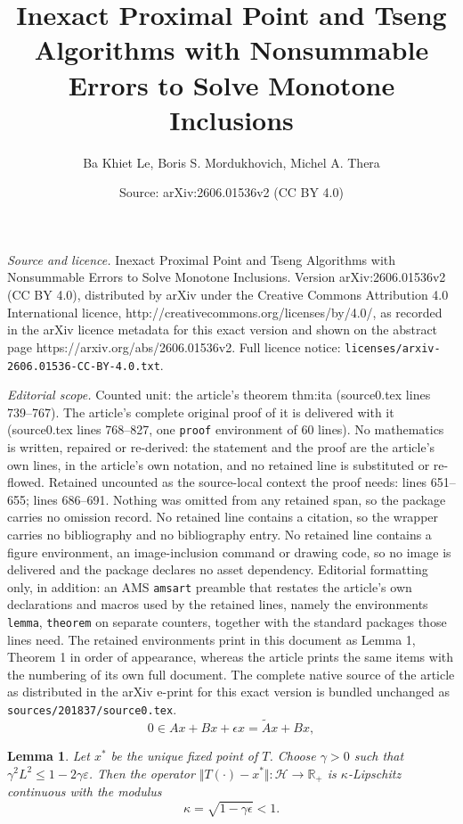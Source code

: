 \documentclass[10pt,a4paper]{amsart}
\title{Inexact Proximal Point and Tseng Algorithms with Nonsummable Errors to Solve Monotone Inclusions}
\author{Ba Khiet Le, Boris S. Mordukhovich, Michel A. Thera}
\date{Source: arXiv:2606.01536v2 (CC BY 4.0)}
\newtheorem{lemma}{Lemma}
\newcommand{\R}{{\mathbb R}}
\begin{document}
\maketitle

\noindent\emph{Source and licence.} Inexact Proximal Point and Tseng Algorithms with Nonsummable Errors to Solve Monotone Inclusions. Version arXiv:2606.01536v2 (CC BY 4.0), distributed by arXiv under the Creative Commons Attribution 4.0 International licence, http://creativecommons.org/licenses/by/4.0/, as recorded in the arXiv licence metadata for this exact version and shown on the abstract page https://arxiv.org/abs/2606.01536v2. Full licence notice: \texttt{licenses/arxiv-2606.01536-CC-BY-4.0.txt}.\par\smallskip

\noindent\textit{Editorial scope.} Counted unit: the article's theorem thm:ita (source0.tex lines 739--767). The article's complete original proof of it is delivered with it (source0.tex lines 768--827, one \texttt{proof} environment of 60 lines). No mathematics is written, repaired or re-derived: the statement and the proof are the article's own lines, in the article's own notation, and no retained line is substituted or re-flowed.  Retained uncounted as the source-local context the proof needs: lines 651--655; lines 686--691.  Nothing was omitted from any retained span, so the package carries no omission record.  No retained line contains a citation, so the wrapper carries no bibliography and no bibliography entry.  No retained line contains a figure environment, an image-inclusion command or drawing code, so no image is delivered and the package declares no asset dependency.  Editorial formatting only, in addition: an AMS \texttt{amsart} preamble that restates the article's own declarations and macros used by the retained lines, namely the environments \texttt{lemma}, \texttt{theorem} on separate counters, together with the standard packages those lines need.  The retained environments print in this document as Lemma 1, Theorem 1 in order of appearance, whereas the article prints the same items with the numbering of its own full document.  The complete native source of the article as distributed in the arXiv e-print for this exact version is bundled unchanged as \texttt{sources/201837/source0.tex}.
\begin{equation}\label{tseng1}
0\in Ax+Bx+\epsilon x
=
\widetilde{A}x+Bx,
\end{equation}

\begin{lemma}\label{ab}
Let $x^*$ be the unique fixed point of $T$. Choose $\gamma>0$ such that $\gamma^2 L^2\le 1-2\gamma\varepsilon $. Then the operator $\Vert T(\cdot)-x^*\Vert: \mathcal{H}\to \R_+$ is $\kappa$-Lipschitz continuous with the modulus
$$
\kappa=\sqrt{1-\gamma\epsilon}<1.
$$
\end{lemma}
\end{document}
